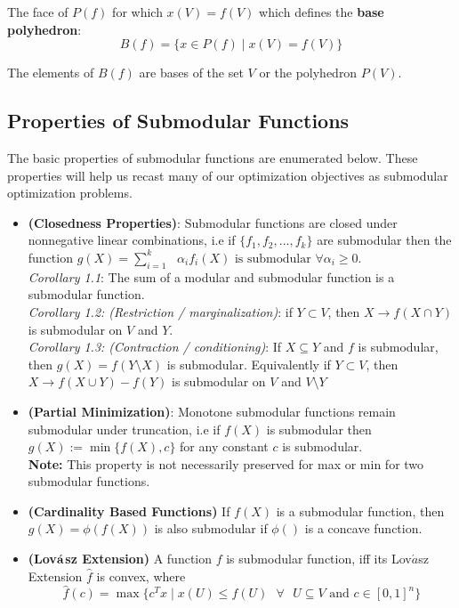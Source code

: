 The face of $P(f)$ for which $x(V) = f(V)$ which defines the {\bf base polyhedron}:\\
\[
 B(f) = \{ x \in P(f) \mid x(V) = f(V)\}
\]

The elements of $B(f)$ are bases of the set $V$ or the polyhedron $P(V)$.


\subsection{Properties of Submodular Functions}
The basic properties of submodular functions are enumerated below. These properties will help us recast many of our optimization objectives as submodular optimization problems.\\

\begin{itemize}
 \item {\bf \lemma (Closedness Properties)}: Submodular functions are closed under nonnegative linear combinations, i.e if $\{f_1,f_2,...,f_k\}$ are submodular then the function $g(X) = \sum\limits_{i=1}^k\text{ } \alpha_if_i(X) \text{ is submodular }\forall \alpha_i \geq 0$.\\
 
 {\it Corollary 1.1}: The sum of a modular and submodular function is a submodular function.\\
 
 {\it Corollary 1.2: (Restriction / marginalization)}: if $Y\subset V$, then $X\rightarrow f(X \cap Y)$ is submodular on $V$ and $Y$.\\
 
 {\it Corollary 1.3: (Contraction / conditioning)}: If $X \subseteq Y$ and $f$ is submodular, then $g(X) = f(Y\setminus X)$ is submodular. Equivalently if $Y\subset V$, then $X\rightarrow f(X \cup Y) - f(Y)$ is submodular on $V$ and $V\setminus Y$\\
 
 \item {\bf \lemma (Partial Minimization)}: Monotone submodular functions remain submodular under truncation, i.e if $f(X)$ is submodular then $g(X) := \min\{f(X),c\}$ for any constant $c$ is submodular.\\
 
 {\bf Note:} This property is not necessarily preserved for max or min for two submodular functions.\\
 
 \item{\bf \lemma (Cardinality Based Functions)} If $f(X)$ is a submodular function, then $g(X) = \phi(f(X))$ is also submodular if $\phi()$ is a concave function.\\
 
 \item{\bf \lemma (Lov$\acute{\bf a}$sz Extension)} A function $f$ is submodular function, iff its Lov$\acute{a}$sz Extension $\hat{f}$ is convex, where
 \[
  \hat{f}(c) = \max\{c^Tx \mid x(U) \leq f(U) \text{ } \forall \text{ } U \subseteq V \text{ and } c\in[0,1]^n\}
 \]

\end{itemize}
